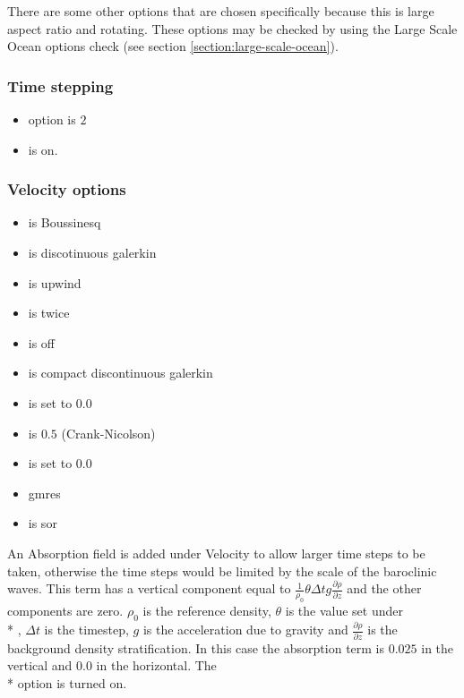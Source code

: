 There are some other options that are chosen specifically because this is large aspect ratio and rotating. These options may be checked by using the Large Scale Ocean options check (see section \ref{section:large-scale-ocean}).

\subsubsection{Time stepping}
\begin{itemize}
\item {} option is $2$ 
\item {} is on.
\end{itemize}

\subsubsection{Velocity options}
\begin{itemize}
\item {} is Boussinesq
\item {} is discotinuous galerkin
\item {} is upwind
\item {} is twice
\item {} is off
\item {} is compact discontinuous galerkin
\item {} is set to $0.0$
\item {} is $0.5$ (Crank-Nicolson)
\item {} is set to $0.0$
\item {}  gmres 
\item {} is sor
\end{itemize}
An Absorption field is added under Velocity to allow larger time steps to be taken, otherwise the time steps would be limited by the scale of the baroclinic waves.  This term has a vertical component equal to  ${\frac{1}{\rho_0}} {\theta} {\Delta} {t} {g} {\frac{\partial \rho}{\partial z}}$ and the other components are zero. $\rho_0$ is the reference density, $\theta$ is the value set under \\* , ${\Delta} {t} $ is the timestep, $g$ is the acceleration due to gravity and $\frac{\partial \rho}{\partial z}$ is the background density stratification.   In this case the absorption term is $0.025$ in the vertical and $0.0$ in the horizontal. The \\*  option is turned on.


